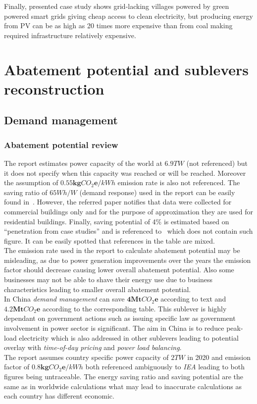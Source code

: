 \documentclass[11pt, twocolumn]{article}
\begin{document}
Finally, presented case study shows grid-lacking villages powered by green powered smart grids giving cheap access to clean electricity, but producing energy from PV can be as high as 20 times more expensive than from coal making required infrastructure relatively expensive.


\section{Abatement potential and sublevers reconstruction}

\subsection{Demand management}
\subsubsection{Abatement potential review}
The report estimates power capacity of the world at $6.9 TW$ (not referenced) but it does not specify when this capacity was reached or will be reached. Moreover the assumption of $\mathbf{0.55} \mathbf{kg}CO_2\mathbf{e} / kWh$ emission rate is also not referenced. The saving ratio of $65 Wh/W$ (demand response) used in the report can be easily found in~\citep{grid2008green}. However, the referred paper notifies that data were collected for commercial buildings only and for the purpose of approximation they are used for residential buildings. Finally, saving potential of 4\% is estimated based on ``penetration from case studies'' and is referenced to~\citep{grid2008green} which does not contain such figure. It can be easily spotted that references in the table are mixed.\\
The emission rate used in the report to calculate abatement potential may be misleading, as due to power generation improvements over the years the emission factor should decrease causing lower overall abatement potential. Also some businesses may not be able to shave their energy use due to business characteristics leading to smaller overall abatement potential.\\

In China \emph{demand management} can save $\mathbf{4} \mathbf{Mt}CO_2\mathbf{e}$ according to text and $\mathbf{4.2} \mathbf{Mt}CO_2\mathbf{e}$ according to the corresponding table. This sublever is highly dependant on government actions such as issuing specific law as government involvement in power sector is significant. The aim in China is to reduce peak-load electricity which is also addressed in other sublevers leading to potential overlay with \emph{time-of-day pricing} and \emph{power load balancing}.\\
The report assumes country specific power capacity of $2 TW$ in 2020 and emission factor of $\mathbf{0.8} \mathbf{kg}CO_2\mathbf{e} / kWh$ both referenced ambiguously to \emph{IEA} leading to both figures being untraceable. The energy saving ratio and saving potential are the same as in worldwide calculations what may lead to inaccurate calculations as each country has different economic.\\
\end{document}
